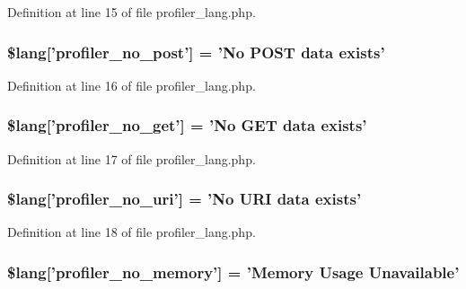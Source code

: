 Definition at line 15 of file profiler\-\_\-lang.\-php.

\hypertarget{profiler__lang_8php_a06e8171d08be812398060c126233a237}{
\subsubsection[{\$lang}]{\setlength{\rightskip}{0pt plus 5cm}\$lang\mbox{[}'profiler\-\_\-no\-\_\-post'\mbox{]} = 'No P\-O\-S\-T data exists'}}\label{profiler__lang_8php_a06e8171d08be812398060c126233a237}


Definition at line 16 of file profiler\-\_\-lang.\-php.

\hypertarget{profiler__lang_8php_a8ecf037acbeb4a7b202b8238c8d1a328}{
\subsubsection[{\$lang}]{\setlength{\rightskip}{0pt plus 5cm}\$lang\mbox{[}'profiler\-\_\-no\-\_\-get'\mbox{]} = 'No G\-E\-T data exists'}}\label{profiler__lang_8php_a8ecf037acbeb4a7b202b8238c8d1a328}


Definition at line 17 of file profiler\-\_\-lang.\-php.

\hypertarget{profiler__lang_8php_ac7d16f2f99b12aeaa609be6bcb89759e}{
\subsubsection[{\$lang}]{\setlength{\rightskip}{0pt plus 5cm}\$lang\mbox{[}'profiler\-\_\-no\-\_\-uri'\mbox{]} = 'No U\-R\-I data exists'}}\label{profiler__lang_8php_ac7d16f2f99b12aeaa609be6bcb89759e}


Definition at line 18 of file profiler\-\_\-lang.\-php.

\hypertarget{profiler__lang_8php_a32345afdaa3f160ba1d21d03223313ad}{
\subsubsection[{\$lang}]{\setlength{\rightskip}{0pt plus 5cm}\$lang\mbox{[}'profiler\-\_\-no\-\_\-memory'\mbox{]} = 'Memory Usage Unavailable'}}\label{profiler__lang_8php_a32345afdaa3f160ba1d21d03223313ad}


